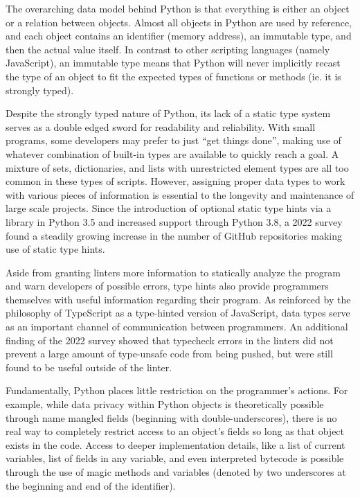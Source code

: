 \documentclass{article}
\begin{document}
The overarching data model behind Python is that everything is either an object or a relation between objects.
Almost all objects in Python are used by reference, and each object contains an identifier (memory address),
an immutable type, and then the actual value itself. In contrast to other scripting languages (namely JavaScript),
an immutable type means that Python will never implicitly recast the type of an object to fit the expected types
of functions or methods (ie. it is strongly typed).

Despite the strongly typed nature of Python, its lack of a static type system serves as a double edged sword for
readability and reliability. With small programs, some developers may prefer to just ``get things done'',
making use of whatever combination of built-in types are available to quickly reach a goal.
A mixture of sets, dictionaries, and lists with unrestricted element types are all too common in these types of scripts.
However, assigning proper data types to work with various pieces of information is essential
to the longevity and maintenance of large scale projects. Since the introduction of optional static type hints
via a library in Python 3.5 and increased support through Python 3.8,
a 2022 survey \cite{empiricalTypePython} found a steadily growing increase in the number of GitHub repositories
making use of static type hints.

Aside from granting linters more information to statically analyze the program and warn developers of possible errors,
type hints also provide programmers themselves with useful information regarding their program. As reinforced
by the philosophy of TypeScript as a type-hinted version of JavaScript, data types serve as an important
channel of communication between programmers. An additional finding of the 2022 survey \cite{empiricalTypePython}
showed that typecheck errors in the linters did not prevent a large amount of type-unsafe code from being pushed, but were
still found to be useful outside of the linter.

Fundamentally, Python places little restriction on the programmer's actions. For example, while
data privacy within Python objects is theoretically possible through name mangled fields (beginning with double-underscores),
there is no real way to completely restrict access to an object's fields so long as that object exists in the code.
Access to deeper implementation details, like a list of current variables, list of fields in any variable, and even
interpreted bytecode is possible through the use of magic methods and variables
(denoted by two underscores at the beginning and end of the identifier).
\end{document}
